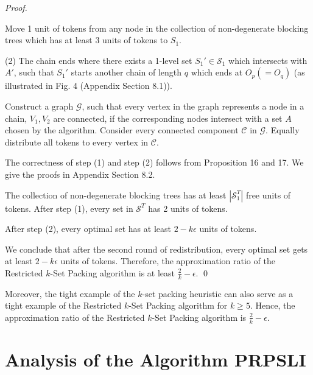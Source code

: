 \documentclass[runningheads,a4paper]{llncs}
\numberwithin{equation}{section}
\begin{document}
\begin{proof}
\begin{itemize}
        Move 1 unit of tokens from any node in the collection of non-degenerate blocking trees which has at least 3 units of tokens to $S_1$.

        (2) The chain ends where there exists a 1-level set $S_1'\in\mathscr{S}_1$ which intersects with $A'$, such that $S_1'$ starts another chain of length $q$ which ends at $O_p(=O_q)$ (as illustrated in Fig. 4 (Appendix Section 8.1)).


        Construct a graph $\mathscr{G}$, such that every vertex in the graph represents a node in a chain, $V_1,V_2$ are connected, if the corresponding nodes intersect with a set $A$ chosen by the algorithm. Consider every connected component $\mathscr{C}$ in $\mathscr{G}$. Equally distribute all tokens to every vertex in $\mathscr{C}$.







    \end{itemize}


The correctness of step (1) and step (2) follows from Proposition 16 and 17. We give the proofs in Appendix Section 8.2.
\begin{proposition}
The collection of non-degenerate blocking trees has at least $|\mathscr{S}_1^T|$ free units of tokens. After step (1), every set in $\mathscr{S}^T$ has 2 units of tokens.
\end{proposition}

\begin{proposition}
After step (2), every optimal set has at least $2-k\epsilon$ units of tokens.
\end{proposition}

We conclude that after the second round of redistribution, every optimal set gets at least $2-k\epsilon$ units of tokens. Therefore, the approximation ratio of the Restricted $k$-Set Packing algorithm is at least $\frac{2}{k}-\epsilon$. \qed
\end{proof}

Moreover, the tight example of the $k$-set packing heuristic \cite{schrijver} can also serve as a tight example of the Restricted $k$-Set Packing algorithm for $k\geq 5$. Hence, the approximation ratio of the Restricted $k$-Set Packing algorithm is $\frac{2}{k}-\epsilon$. \\




\section{Analysis of the Algorithm PRPSLI}
\end{document}
